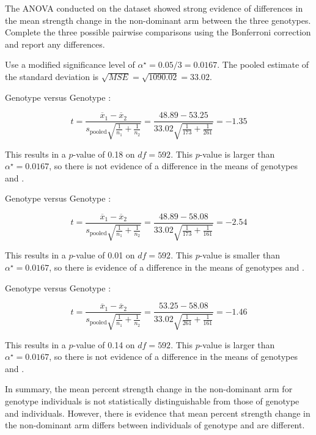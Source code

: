 \begin{examplewrap}
\begin{nexample}{The ANOVA conducted on the  dataset showed strong evidence of differences in the mean strength change in the non-dominant arm between the three genotypes. Complete the three possible pairwise comparisons using the Bonferroni correction and report any differences.}

Use a modified significance level of $\alpha^\star = 0.05/3 = 0.0167$. The pooled estimate of the standard deviation is $\sqrt{MSE} = \sqrt{1090.02} = 33.02$.

Genotype  versus Genotype : 

\[
t = \frac{\overline{x}_1 - \overline{x}_2}{s_{\text{pooled}}\sqrt{\frac{1}{n_1} + \frac{1}{n_2}}} 
 = \dfrac{48.89 - 53.25}{33.02 \sqrt{\frac{1}{173} + \frac{1}{261}}} = -1.35\]
 
This results in a $p$-value of 0.18 on $df =592$. This $p$-value is larger than $\alpha^\star = 0.0167$, so there is not evidence of a difference in the means of genotypes  and .

Genotype  versus Genotype : 
 
 \[
 t = \frac{\overline{x}_1 - \overline{x}_2}{s_{\text{pooled}}\sqrt{\frac{1}{n_1} + \frac{1}{n_2}}}
 = \dfrac{48.89 - 58.08}{33.02 \sqrt{\frac{1}{173} + \frac{1}{161}}} = -2.54\]

This results in a $p$-value of 0.01 on $df =592$. This $p$-value is smaller than $\alpha^\star = 0.0167$, so there is evidence of a difference in the means of genotypes  and .
 
Genotype  versus Genotype :  
 
 \[
 t = \frac{\overline{x}_1 - \overline{x}_2}{s_{\text{pooled}}\sqrt{\frac{1}{n_1} + \frac{1}{n_2}}}
 = \dfrac{53.25 - 58.08}{33.02 \sqrt{\frac{1}{261} + \frac{1}{161}}} = -1.46\]

This results in a $p$-value of 0.14 on $df =592$. This $p$-value is larger than $\alpha^\star = 0.0167$, so there is not evidence of a difference in the means of genotypes  and .

In summary, the mean percent strength change in the non-dominant arm for genotype  individuals is not statistically distinguishable from those of genotype  and  individuals. However, there is evidence that mean percent strength change in the non-dominant arm differs between individuals of genotype  and  are different. 
\end{nexample}
\end{examplewrap}

